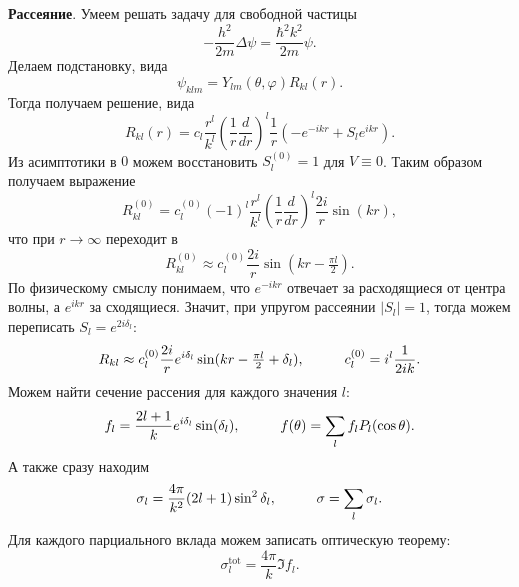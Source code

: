 

\textbf{Рассеяние}. Умеем решать задачу для свободной частицы
\begin{equation*}
	- \frac{h^2}{2m} \Delta \psi = \frac{\hbar^2 k^2}{2m}\psi.
\end{equation*}
Делаем подстановку, вида
\begin{equation*}
	\psi_{klm} = Y_{lm} (\theta, \varphi) R_{kl} (r).
\end{equation*}
Тогда получаем решение, вида
\begin{equation*}
	R_{kl} (r) = c_l \frac{r^l}{k^l} \left( \frac{1}{r} \frac{d }{d r} \right)^l \frac{1}{r} \left(
		- e^{- ik r} + S_l e^{ikr}
	\right).
\end{equation*}
Из асимптотики в $0$ можем восстановить $S_l^{(0)} = 1$ для $V \equiv 0$. Таким образом получаем выражение
\begin{equation*}
	R_{kl}^{(0)} = c_l^{(0)} (-1)^l \frac{r^l}{k^l} \left(
		\frac{1}{r} \frac{d }{d r} 
	\right)^l \frac{2i}{r} \sin(kr),
\end{equation*}
что при $r \to \infty$ переходит в 
\begin{equation*}
	R_{kl}^{(0)} \approx c_l^{(0)} \frac{2i}{r} \sin(kr - \tfrac{\pi l}{2}).
\end{equation*}
По физическому смыслу понимаем, что $e^{-ikr}$ отвечает за расходящиеся от центра волны, а $e^{ikr}$ за сходящиеся. Значит, при упругом рассеянии $|S_l| = 1$, тогда можем переписать $S_l = e^{2 i \delta_l}$:
\begin{equation*}
	R_{kl} \approx c_l^{(0)} \frac{2i}{r} e^{i \delta_l} \sin(kr - \tfrac{\pi l}{2} + \delta_l),
	\hspace{10 mm} 
	c_l^{(0)} = i^l \frac{1}{2ik}.
\end{equation*}
Можем найти сечение рассения для каждого значения $l$:
\begin{equation*}
	f_l = \frac{2l+1}{k} e^{i \delta_l} \sin(\delta_l),
	\hspace{10 mm} 
	f(\theta) = \sum_l f_l P_l(\cos \theta).
\end{equation*}
А также сразу находим
\begin{equation*}
	\sigma_l = \frac{4 \pi}{k^2} (2l + 1) \sin^2 \delta_l,
	\hspace{10 mm} 
	\sigma = \sum_l \sigma_l.
\end{equation*}
Для каждого парциального вклада можем записать оптическую теорему:
\begin{equation*}
	\sigma_l^{\text{tot}} = \frac{4 \pi}{k} \Im f_l.
\end{equation*}

